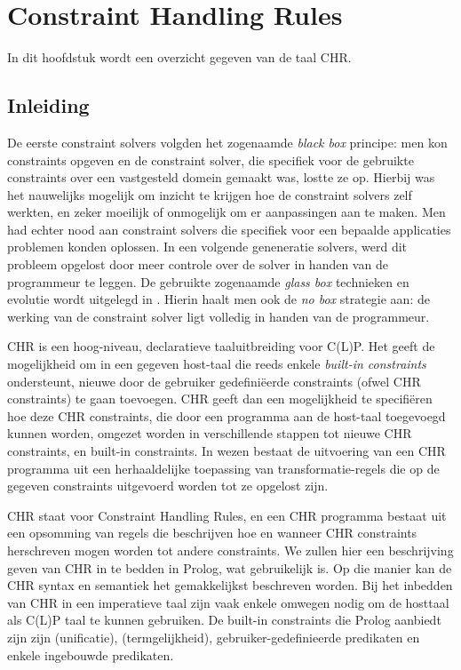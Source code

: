 \chapter{Constraint Handling Rules}

In dit hoofdstuk wordt een overzicht gegeven van de taal CHR.

\section{Inleiding}

De eerste constraint solvers volgden het zogenaamde {\em black box} principe: men kon constraints opgeven en de constraint solver, die specifiek voor de gebruikte constraints over een vastgesteld domein gemaakt was, lostte ze op. Hierbij was het nauwelijks mogelijk om inzicht te krijgen hoe de constraint solvers zelf werkten, en zeker moeilijk of onmogelijk om er aanpassingen aan te maken. Men had echter nood aan constraint solvers die specifiek voor een bepaalde applicaties problemen konden oplossen. In een volgende geneneratie solvers, werd dit probleem opgelost door meer controle over de solver in handen van de programmeur te leggen. De gebruikte zogenaamde  {\em glass box} technieken en evolutie wordt uitgelegd in \cite{chr}. Hierin haalt men ook de {\em no box} strategie aan: de werking van de constraint solver ligt volledig in handen van de programmeur.

CHR is een hoog-niveau, declaratieve taaluitbreiding voor C(L)P. Het geeft de mogelijkheid om in een gegeven host-taal die reeds enkele {\em built-in constraints} ondersteunt, nieuwe door de gebruiker gedefini\"eerde constraints (ofwel CHR constraints) te gaan toevoegen. CHR geeft dan een mogelijkheid te specifi\"eren hoe deze CHR constraints, die door een programma aan de host-taal toegevoegd kunnen worden, omgezet worden in verschillende stappen tot nieuwe CHR constraints, en built-in constraints. In wezen bestaat de uitvoering van een CHR programma uit een herhaaldelijke toepassing van transformatie-regels die op de gegeven constraints uitgevoerd worden tot ze opgelost zijn.

CHR staat voor Constraint Handling Rules, en een CHR programma bestaat uit een opsomming van regels die beschrijven hoe en wanneer CHR constraints herschreven mogen worden tot andere constraints. We zullen hier een beschrijving geven van CHR in te bedden in Prolog, wat gebruikelijk is. Op die manier kan de CHR syntax en semantiek het gemakkelijkst beschreven worden. Bij het inbedden van CHR in een imperatieve taal zijn vaak enkele omwegen nodig om de hosttaal als C(L)P taal te kunnen gebruiken. De built-in constraints die Prolog aanbiedt zijn zijn \code{=} (unificatie), \code{==} (termgelijkheid), gebruiker-gedefinieerde predikaten en enkele ingebouwde predikaten.

